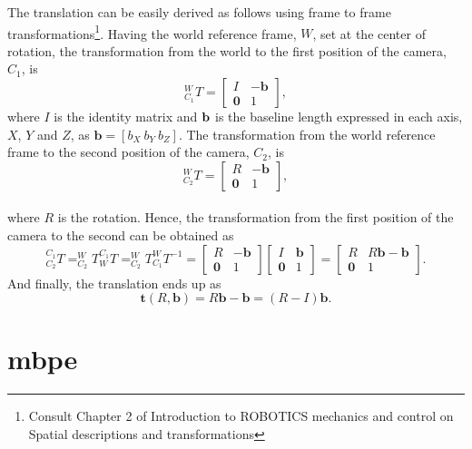 The translation can be easily derived as follows using frame to frame transformations\footnote{Consult Chapter 2 of Introduction to ROBOTICS mechanics and control \cite{robotics} on Spatial descriptions and transformations}. Having the world reference frame, ${W}$, set at the center of rotation, the transformation from the world to the first position of the camera, ${C_1}$, is
\begin{equation}
^W_{C_1}T = \begin{bmatrix}
I & -\mathbf{b}\\ 
\mathbf{0} & 1
\end{bmatrix},
\end{equation} 
where $I$ is the identity matrix and $\bf b$ is the baseline length expressed in each axis, $X$, $Y$ and $Z$, as $\mathbf{b} = [b_X \ b_Y \ b_Z]$. 
The transformation from the world reference frame to the second position of the camera, ${C_2}$, is
\begin{equation}
^W_{C_2}T = \begin{bmatrix}
R & -\mathbf{b}\\ 
\mathbf{0} & 1
\end{bmatrix},
\end{equation}\\
where $R$ is the rotation.
Hence, the transformation from the first position of the camera to the second can be obtained as
\begin{equation}
^{C_1}_{C_2}T = ^{W}_{C_2}T ^{C_1}_{W}T = ^{W}_{C_2}T ^{W}_{C_1}T^{-1} = 
\begin{bmatrix}
R & -\mathbf{b}\\ 
\mathbf{0} & 1
\end{bmatrix}
\begin{bmatrix}
I & \mathbf{b}\\ 
\mathbf{0} & 1
\end{bmatrix}
=
\begin{bmatrix}
R & R\mathbf{b}-\mathbf{b}\\ 
\mathbf{0} & 1
\end{bmatrix}.
\end{equation}
And finally, the translation ends up as
\begin{equation}
\mathbf{t}(R, \mathbf{b}) = R\mathbf{b}-\mathbf{b} = (R-I)\mathbf{b}.
\end{equation}

\section{\acrlong{mbpe}}
\label{MBaPE}

